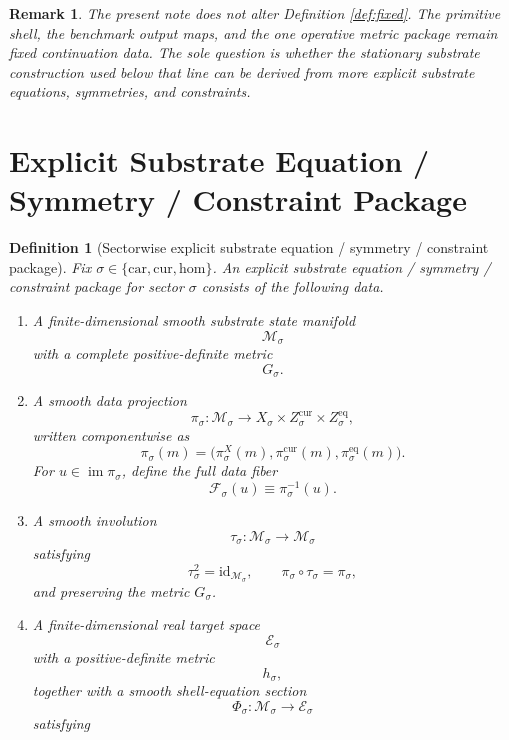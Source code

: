 \documentclass[11pt]{article}
\newcommand{\Car}{\mathrm{car}}
\newcommand{\Cur}{\mathrm{cur}}
\newcommand{\Hom}{\mathrm{hom}}
\newcommand{\SubSpace}[1]{\mathcal M_{#1}}
\newcommand{\SubMetric}[1]{G_{#1}}
\newcommand{\DataProj}[1]{\pi_{#1}}
\newcommand{\SubVisible}[1]{\pi_{#1}^{X}}
\newcommand{\SubCurrent}[1]{\pi_{#1}^{\mathrm{cur}}}
\newcommand{\SubEq}[1]{\pi_{#1}^{\mathrm{eq}}}
\newcommand{\SubTarget}[1]{\mathcal E_{#1}}
\newcommand{\SubTargetMetric}[1]{h_{#1}}
\newcommand{\ShellEquation}[1]{\Phi_{#1}}
\newcommand{\Fiber}[1]{\mathcal F_{#1}}
\newcommand{\TimeRev}[1]{\tau_{#1}}
\newtheorem{definition}{Definition}
\newtheorem{remark}{Remark}
\begin{document}
\begin{remark}
The present note does not alter Definition \ref{def:fixed}. The primitive shell, the benchmark output maps, and the one operative metric package remain fixed continuation data. The sole question is whether the stationary substrate construction used below that line can be derived from more explicit substrate equations, symmetries, and constraints.
\end{remark}

\section{Explicit Substrate Equation / Symmetry / Constraint Package}

\begin{definition}[Sectorwise explicit substrate equation / symmetry / constraint package]
\label{def:package}
Fix \(\sigma\in\{\Car,\Cur,\Hom\}\). An \emph{explicit substrate equation / symmetry / constraint package} for sector \(\sigma\) consists of the following data.
\begin{enumerate}
    \item A finite-dimensional smooth substrate state manifold
    \[
    \SubSpace{\sigma}
    \]
    with a complete positive-definite metric
    \[
    \SubMetric{\sigma}.
    \]
    \item A smooth data projection
    \[
    \DataProj{\sigma}:\SubSpace{\sigma}\to
    X_{\sigma}\times Z_{\sigma}^{\mathrm{cur}}\times Z_{\sigma}^{\mathrm{eq}},
    \]
    written componentwise as
    \[
    \DataProj{\sigma}(m)
    =
    \bigl(
    \SubVisible{\sigma}(m),
    \SubCurrent{\sigma}(m),
    \SubEq{\sigma}(m)
    \bigr).
    \]
    For \(u\in\operatorname{im}\DataProj{\sigma}\), define the full data fiber
    \[
    \Fiber{\sigma}(u)\equiv\DataProj{\sigma}^{-1}(u).
    \]
    \item A smooth involution
    \[
    \TimeRev{\sigma}:\SubSpace{\sigma}\to\SubSpace{\sigma}
    \]
    satisfying
    \[
    \TimeRev{\sigma}^{2}=\mathrm{id}_{\SubSpace{\sigma}},
    \qquad
    \DataProj{\sigma}\circ\TimeRev{\sigma}=\DataProj{\sigma},
    \]
    and preserving the metric \(\SubMetric{\sigma}\).
    \item A finite-dimensional real target space
    \[
    \SubTarget{\sigma}
    \]
    with a positive-definite metric
    \[
    \SubTargetMetric{\sigma},
    \]
    together with a smooth shell-equation section
    \[
    \ShellEquation{\sigma}:\SubSpace{\sigma}\to\SubTarget{\sigma}
    \]
    satisfying

\end{enumerate}
\end{definition}
\end{document}
